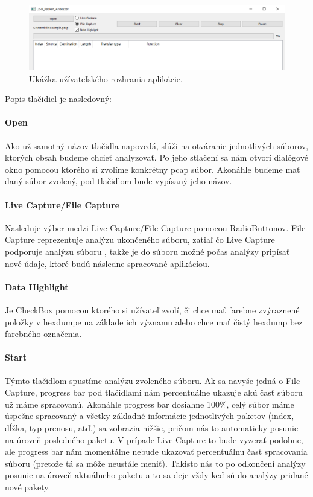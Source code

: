 \begin{figure}[!htb]
	\centering
	\includegraphics[width=\textwidth]{img/kap06_gui}
	\caption{Ukážka užívateľského rozhrania aplikácie.}
	\label{obr:kap6:gui}
\end{figure}

Popis tlačidiel je nasledovný:

\paragraph{Open} 
\hfill\break
Ako už samotný názov tlačidla napovedá, slúži na otváranie jednotlivých súborov, ktorých obsah budeme chcieť analyzovať.
Po jeho stlačení sa nám otvorí dialógové okno pomocou ktorého si zvolíme konkrétny pcap súbor. Akonáhle budeme mať daný súbor zvolený, pod tlačidlom bude vypísaný jeho názov.

\paragraph{Live Capture/File Capture}
\hfill\break
Nasleduje výber medzi Live Capture/File Capture pomocou RadioButtonov. File Capture reprezentuje analýzu ukončeného súboru, zatiaľ čo Live Capture podporuje analýzu súboru , takže je do súboru možné počas analýzy pripísať nové údaje, ktoré budú následne spracované aplikáciou.

\paragraph{Data Highlight}
\hfill\break
Je CheckBox pomocou ktorého si užívateľ zvolí, či chce mať farebne zvýraznené položky v hexdumpe na základe ich významu alebo chce mať čistý hexdump bez farebného označenia. 

\paragraph{Start}
\hfill\break
Týmto tlačidlom spustíme analýzu zvoleného súboru. Ak sa navyše jedná o File Capture, progress bar pod tlačidlami nám percentuálne ukazuje akú časť súboru už máme spracovanú. Akonáhle progress bar dosiahne 100\%, celý súbor máme úspešne spracovaný a všetky základné informácie jednotlivých paketov (index, dĺžka, typ prenosu, atď.) sa zobrazia nižšie, pričom nás to automaticky posunie na úroveň posledného paketu. V prípade Live Capture to bude vyzerať podobne, ale progress bar nám momentálne nebude ukazovať percentuálnu časť spracovania súboru (pretože tá sa môže neustále meniť). Takisto nás to po odkončení analýzy posunie na úroveň aktuálneho paketu a to sa deje vždy keď sú do analýzy pridané nové pakety.

